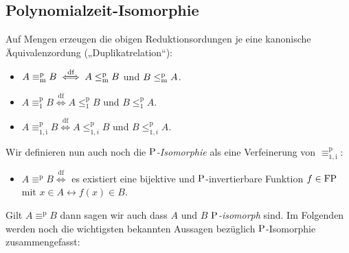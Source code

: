 \subsection*{Polynomialzeit-Isomorphie}
Auf Mengen erzeugen die obigen Reduktionsordungen je eine kanonische Äquivalenzordung („Duplikatrelation“):
\begin{itemize}
\item $A\equiv_\mathrm{m}^\mathrm{p} B \stackrel{\text{df}}{\iff} A\leqmp B$ und $B\leqmp A$.
\item $A\equiv_\mathrm{1}^\mathrm{p} B \stackrel{\text{df}}{\iff} A\leq_1^\mathrm{p} B$ und $B\leq_1^\mathrm{p} A$.
\item $A\equiv_\mathrm{1,i}^\mathrm{p} B \stackrel{\text{df}}{\iff} A\leq_{1,i}^\mathrm{p} B$ und $B\leq_{1,i}^\mathrm{p} A$.
\end{itemize}
Wir definieren nun auch noch die \emph{$\P$-Isomorphie} als eine Verfeinerung von $\equiv_\mathrm{1,i}^\mathrm{p}$:
\begin{itemize}
    \item $A\equiv^\mathrm{p} B \stackrel{\text{df}}{\iff}$ es existiert eine bijektive und $\P$-invertierbare Funktion $f\in\FP$ mit $x\in A\leftrightarrow f(x)\in B$.
\end{itemize}
Gilt $A\equiv^\mathrm{p} B$ dann sagen wir auch dass $A$ und $B$ \emph{$\P$-isomorph} sind.
Im Folgenden werden noch die wichtigsten bekannten Aussagen bezüglich $\P$-Isomorphie zusammengefasst:

